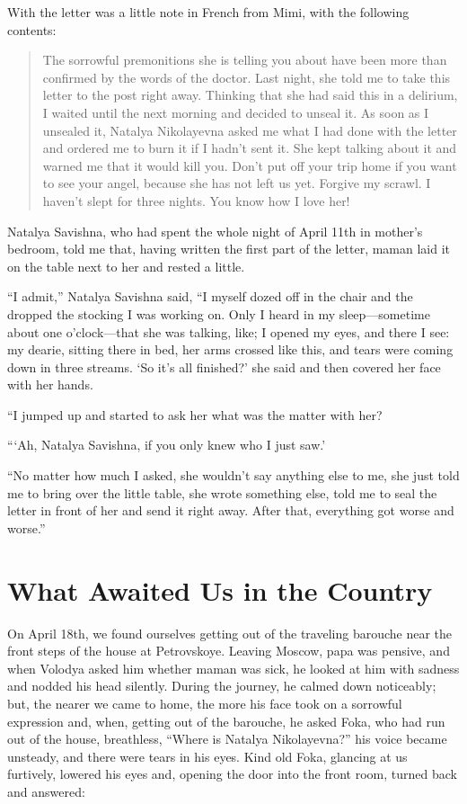 With the letter was a little note in French from Mimi, with the following contents:

\begin{quotation}
The sorrowful premonitions she is telling you about have been more than confirmed by the words of the doctor. Last night, she told me to take this letter to the post right away. Thinking that she had said this in a delirium, I waited until the next morning and decided to unseal it. As soon as I unsealed it, Natalya Nikolayevna asked me what I had done with the letter and ordered me to burn it if I hadn't sent it. She kept talking about it and warned me that it would kill you. Don't put off your trip home if you want to see your angel, because she has not left us yet. Forgive my scrawl. I haven't slept for three nights. You know how I love her!
\end{quotation}

Natalya Savishna, who had spent the whole night of April 11th in mother's bedroom, told me that, having written the first part of the letter, maman laid it on the table next to her and rested a little.

``I admit,'' Natalya Savishna said, ``I myself dozed off in the chair and the dropped the stocking I was working on. Only I heard in my sleep---sometime about one o'clock---that she was talking, like; I opened my eyes, and there I see: my dearie, sitting there in bed, her arms crossed like this, and tears were coming down in three streams. `So it's all finished?' she said and then covered her face with her hands. %

``I jumped up and started to ask her what was the matter with her? %

```Ah, Natalya Savishna, if you only knew who I just saw.' %

``No matter how much I asked, she wouldn't say anything else to me, she just told me to bring over the little table, she wrote something else, told me to seal the letter in front of her and send it right away. After that, everything got worse and worse.'' %

\chapter{What Awaited Us in the Country} %

On April 18th, we found ourselves getting out of the traveling barouche near the front steps of the house at Petrovskoye. Leaving Moscow, papa was pensive, and when Volodya asked him whether maman was sick, he looked at him with sadness and nodded his head silently. During the journey, he calmed down noticeably; but, the nearer we came to home, the more his face took on a sorrowful expression and, when, getting out of the barouche, he asked Foka, who had run out of the house, breathless, ``Where is Natalya Nikolayevna?'' his voice became unsteady, and there were tears in his eyes. Kind old Foka, glancing at us furtively, lowered his eyes and, opening the door into the front room, turned back and answered:

